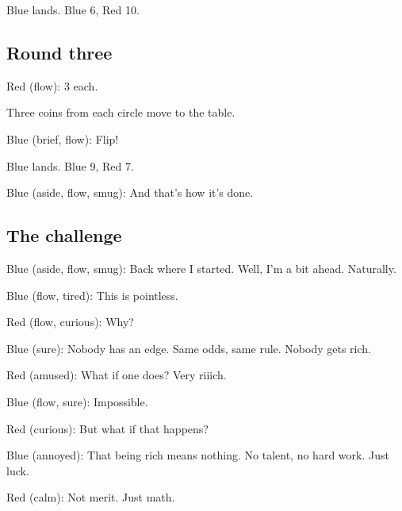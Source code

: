 Blue lands. Blue 6, Red 10.



\subsection{Round three}\label{round3}


Red (flow): 3 each.

Three coins from each circle move to the table.

Blue (brief, flow): Flip!

Blue lands. Blue 9, Red 7.


Blue (aside, flow, smug): And that's how it's done.

\subsection{The challenge}\label{dare}

Blue (aside, flow, smug): Back where I started.
Well, I'm a bit ahead.
Naturally.

Blue (flow, tired): This is pointless.

Red (flow, curious): Why?

Blue (sure): Nobody has an edge.
Same odds, same rule.
Nobody gets rich.

Red (amused): What if one does?
{\Large Very riiich.}

Blue (flow, sure): {\Large Impossible.}


Red (curious): But what if that happens?

Blue (annoyed): That being rich means nothing.
No talent, no hard work. Just luck.

Red (calm): Not merit. Just math.

